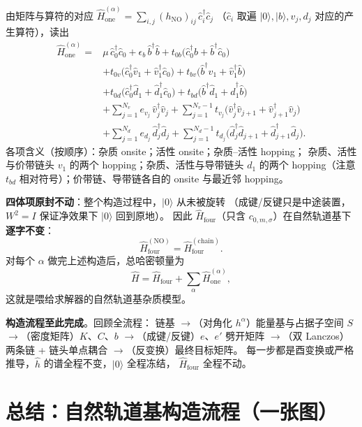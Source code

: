 \documentclass[11pt]{ctexart}
\begin{document}
由矩阵与算符的对应 $\hat H_{\mathrm{one}}^{(\alpha)}=\sum_{i,j}(h_{\mathrm{NO}})_{ij}\,\hat c_i^{\dagger}\hat c_j$
（$\hat c_i$ 取遍 $|0\rangle,|b\rangle,v_j,d_j$ 对应的产生算符），读出
\[
\begin{aligned}
\hat H_{\mathrm{one}}^{(\alpha)}
={}&
\mu\,\hat c_0^\dagger \hat c_0
+\epsilon_b\,\hat b^\dagger \hat b
+t_{0b}\big(\hat c_0^\dagger \hat b+\hat b^\dagger \hat c_0\big)\\
&
+t_{0v}\big(\hat c_0^\dagger \hat v_1+\hat v_1^\dagger \hat c_0\big)
+t_{bv}\big(\hat b^\dagger \hat v_1+\hat v_1^\dagger \hat b\big)\\
&
+t_{0d}\big(\hat c_0^\dagger \hat d_1+\hat d_1^\dagger \hat c_0\big)
+t_{bd}\big(\hat b^\dagger \hat d_1+\hat d_1^\dagger \hat b\big)\\
&
+\sum_{j=1}^{N_v}e_{v_j}\,\hat v_j^\dagger \hat v_j
+\sum_{j=1}^{N_v-1}t_{v_j}\big(\hat v_j^\dagger \hat v_{j+1}+\hat v_{j+1}^\dagger \hat v_j\big)\\
&
+\sum_{j=1}^{N_d}e_{d_j}\,\hat d_j^\dagger \hat d_j
+\sum_{j=1}^{N_d-1}t_{d_j}\big(\hat d_j^\dagger \hat d_{j+1}+\hat d_{j+1}^\dagger \hat d_j\big) .
\end{aligned}
\]
各项含义（按顺序）：杂质 onsite；活性 onsite；杂质--活性 hopping；
杂质、活性与价带链头 $v_1$ 的两个 hopping；杂质、活性与导带链头 $d_1$ 的两个
hopping（注意 $t_{bd}$ 相对符号）；价带链、导带链各自的 onsite 与最近邻 hopping。

\textbf{四体项原封不动}：整个构造过程中，$|0\rangle$ 从未被旋转
（成键/反键只是中途装置，$W^2=I$ 保证净效果下 $|0\rangle$ 回到原地）。
因此 $\hat H_{\mathrm{four}}$（只含 $c_{0,m,\sigma}$）在自然轨道基下\textbf{逐字不变}：
\[
\hat H_{\mathrm{four}}^{\mathrm{(NO)}}=\hat H_{\mathrm{four}}^{\mathrm{(chain)}} .
\]
对每个 $\alpha$ 做完上述构造后，总哈密顿量为
\[
\hat H=\hat H_{\mathrm{four}}+\sum_\alpha\hat H_{\mathrm{one}}^{(\alpha)} ,
\]
这就是喂给求解器的自然轨道基杂质模型。

\medskip
\noindent\textbf{构造流程至此完成}。回顾全流程：
链基 $\to$（对角化 $h^\alpha$）能量基与占据子空间 $S$
$\to$（密度矩阵）$K$、$C$、$b$
$\to$（成键/反键）$e$、$e'$ 劈开矩阵
$\to$（双 Lanczos）两条链 + 链头单点耦合
$\to$（反变换）最终目标矩阵。
每一步都是酉变换或严格推导，$\hat h$ 的谱全程不变，$|0\rangle$ 全程冻结，
$\hat H_{\mathrm{four}}$ 全程不动。

\section*{总结：自然轨道基构造流程（一张图）}
\end{document}

